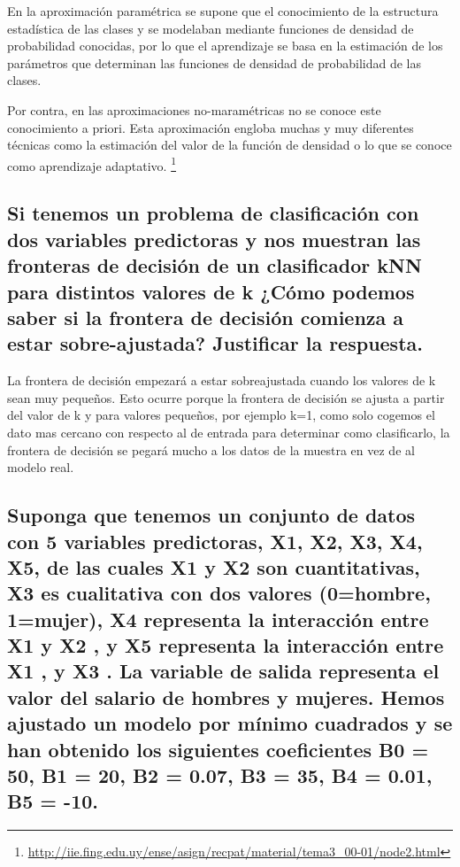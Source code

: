 En la aproximación paramétrica se supone que el conocimiento de la estructura estadística de las clases y se modelaban mediante funciones de densidad de probabilidad conocidas, por lo que el aprendizaje se basa en la estimación de los parámetros que determinan las funciones de densidad de probabilidad de las clases.

Por contra, en las aproximaciones no-maramétricas no se conoce este conocimiento a priori. Esta aproximación engloba muchas y muy diferentes técnicas como la estimación del valor de la función de densidad o lo que se conoce como aprendizaje adaptativo. \footnote{\url{http://iie.fing.edu.uy/ense/asign/recpat/material/tema3_00-01/node2.html}}


\subsection{Si tenemos un problema de clasificación con dos variables predictoras y nos muestran las fronteras de decisión de un clasificador kNN para distintos valores de k ¿Cómo podemos saber si la frontera de decisión comienza a estar sobre-ajustada? Justificar la respuesta.}

La frontera de decisión empezará a estar sobreajustada cuando los valores de k sean muy pequeños. Esto ocurre porque la frontera de decisión se ajusta a partir del valor de k y para valores pequeños, por ejemplo k=1, como solo cogemos el dato mas cercano con respecto al de entrada para determinar como clasificarlo, la frontera de decisión se pegará mucho a los datos de la muestra en vez de al modelo real.


\newpage

\subsection{Suponga que tenemos un conjunto de datos con 5 variables predictoras, X1, X2, X3, X4, X5, de las cuales X1 y X2 son cuantitativas, X3 es cualitativa con dos valores (0=hombre, 1=mujer), X4 representa la interacción entre X1 y X2 , y X5 representa la interacción entre X1 , y X3 . La variable de salida representa el valor del salario de hombres y mujeres. Hemos ajustado un modelo por mínimo cuadrados y se han obtenido los siguientes coeficientes B0 = 50, B1 = 20, B2 = 0.07, B3 = 35, B4 = 0.01, B5 = -10.}


